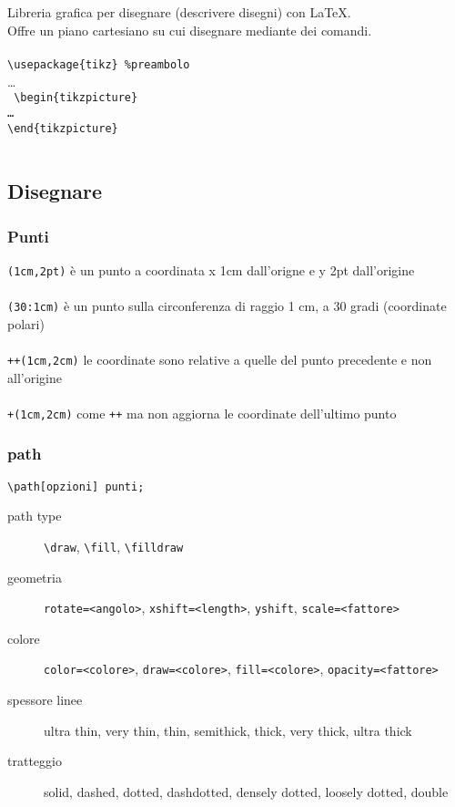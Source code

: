 \section{\Tikz}
  Libreria grafica per disegnare (descrivere disegni) con \LaTeX.\\
  Offre un piano cartesiano su cui disegnare mediante dei comandi.\\~\\
  \texttt{\textbackslash{}usepackage\{tikz\} \%preambolo}\\
  \dots\\\texttt{
  \textbackslash{}begin\{tikzpicture\}\\
  \dots\\
  \textbackslash{}end\{tikzpicture\}~~\\~}
\subsection{Disegnare}
\subsubsection{Punti}
  \texttt{(1cm,2pt)} è un punto a coordinata x 1cm dall'origne e y 2pt dall'origine\\~\\
  \texttt{(30:1cm)} è un punto sulla circonferenza di raggio 1 cm, a 30 gradi (coordinate polari)\\~\\
  \texttt{++(1cm,2cm)} le coordinate sono relative a quelle del punto precedente e non all'origine\\~\\
  \texttt{+(1cm,2cm)} come \texttt{++} ma non aggiorna le coordinate dell'ultimo punto
\subsubsection{path}
  \texttt{\textbackslash{}path[opzioni] punti;}\\
  \begin{description}
    \item[path type] \texttt{\textbackslash{}draw}, \texttt{\textbackslash{}fill}, \texttt{\textbackslash{}filldraw}
    \item[geometria] \texttt{rotate=<angolo>}, \texttt{xshift=<length>}, \texttt{yshift}, \texttt{scale=<fattore>}
    \item[colore] \texttt{color=<colore>}, \texttt{draw=<colore>}, \texttt{fill=<colore>}, \texttt{opacity=<fattore>}
    \item[spessore linee] ultra thin, very thin, thin, semithick, thick, very thick, ultra thick
    \item[tratteggio] solid, dashed, dotted, dashdotted, densely dotted, loosely dotted, double
  \end{description}

